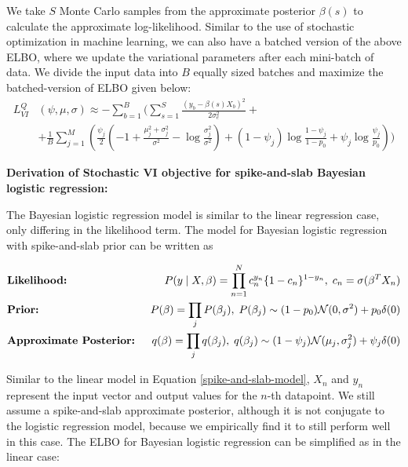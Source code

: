 %
We take $S$ Monte Carlo samples from the approximate posterior $\beta(s)$ to calculate the approximate log-likelihood.
%
Similar to the use of stochastic optimization in machine learning, we can also have a batched version of the above ELBO, where we update the variational parameters after each mini-batch of data.
%
We divide the input data into $B$ equally sized batches and maximize the batched-version of ELBO given below:
\begin{align}
    L^{Q}_{VI}&(\psi, \mu, \sigma) \approx - \sum\limits^{B}_{b=1} \Bigg( \sum\limits^{S}_{s=1} \frac{(y_b - \beta(s) X_b)^2}{2 \sigma_e^2} + \nonumber \\
    &+ \frac{1}{B}\sum\limits^{M}_{j=1} \left(  \frac{\psi_j}{2}\left(-1 + \frac{\mu_j^2 + \sigma_j^2}{\sigma^2} - \log \frac{\sigma_j^2}{\sigma^2} \right) + (1-\psi_j)\log\frac{1 - \psi_j}{1 - p_0} + \psi_j\log\frac{\psi_j}{p_0} \right) \Bigg)
    \label{elbo-loss}
\end{align}


%
\vspace{3mm}
\noindent \textbf{Derivation of Stochastic VI objective for spike-and-slab Bayesian logistic regression:}
\vspace{2mm}
%

%
The Bayesian logistic regression model is similar to the linear regression case, only differing in the likelihood term.
%
The model for Bayesian logistic regression with spike-and-slab prior can be written as
%

\begin{align}
    &\text{\textbf{Likelihood:} } &P(y \mid X, \beta) = \prod_{n=1}^{N} c_n^{y_n} \{1 - c_n\}^{1-y_n}, \hspace{1mm} c_n = \sigma(\beta^T X_n) \nonumber \\
    &\text{\textbf{Prior:} } &P(\beta) = \prod_j P(\beta_j), \hspace{1mm} P(\beta_j) \sim (1-p_0)\mathcal{N} (0, \sigma ^ 2) + p_0 \delta(0) \nonumber \\
    &\text{\textbf{Approximate Posterior:} } &q(\beta) = \prod_j q(\beta_j), \hspace{1mm} q(\beta_j) \sim (1-\psi_j)\mathcal{N}(\mu_j, \sigma^2_j) + \psi_j \delta(0)
    \label{spike-and-slab-model3-rep}
\end{align}

Similar to the linear model in Equation \ref{spike-and-slab-model}, $X_n$ and $y_n$ represent the input vector and output values for the $n$-th datapoint.
%
We still assume a spike-and-slab approximate posterior, although it is not conjugate to the logistic regression model, because we empirically find it to still perform well in this case.
%
The ELBO for Bayesian logistic regression can be simplified as in the linear case:

